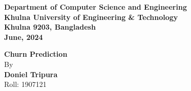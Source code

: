 \begin{titlepage}
\begin{center}
    \vspace{12pt}
    \vspace{12pt}
    \vspace{12pt}
    \vspace{12pt}
    \vspace{12pt}
    \vspace{12pt}
    \vspace{12pt}
    \vspace{12pt}
    \vspace{12pt}
    \vspace{12pt}
    {\fontsize{12}{1.5}\selectfont \textbf{Department of Computer Science and Engineering}}\\
    \vspace{12pt}
    {\fontsize{12}{1.5}\selectfont \textbf{Khulna University of Engineering \& Technology}}\\
    \vspace{12pt}
    {\fontsize{12}{1.5}\selectfont \textbf{Khulna 9203, Bangladesh}}\\
    \vspace{12pt}
    {\fontsize{12}{1.5}\selectfont \textbf{June, 2024}}\\

    \vspace{12pt}
    
    {\fontsize{18}{1.5}\selectfont \textbf{Churn Prediction}}\\
    \vspace{12pt}
    \vspace{12pt}
    \vspace{12pt}
    {\fontsize{12}{1.5}\selectfont By}\\
    \vspace{12pt}
    \vspace{12pt}
    {\fontsize{12}{1.5}\selectfont \textbf{Doniel Tripura}}\\
    \vspace{12pt}
    {\fontsize{12}{1.5}\selectfont Roll: 1907121}\\
    \vspace{12pt}
    \vspace{12pt}
    \vspace{12pt}
    \vspace{12pt}
    \vspace{12pt}
    

\end{center}
\end{titlepage}
